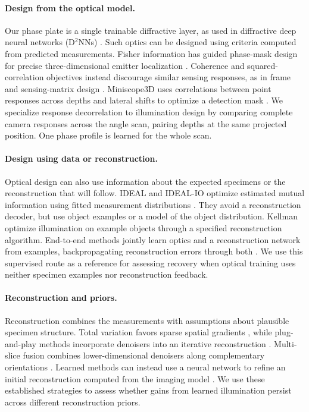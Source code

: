 \paragraph{Design from the optical model.}
Our phase plate is a single trainable diffractive layer, as used in diffractive deep neural networks (D$^2$NNs) \cite{lin2018}. Such optics can be designed using criteria computed from predicted measurements. Fisher information has guided phase-mask design for precise three-dimensional emitter localization \cite{shechtman2014}. Coherence and squared-correlation objectives instead discourage similar sensing responses, as in frame and sensing-matrix design \cite{elad2007,benedetto2003,duarte2009}. Miniscope3D uses correlations between point responses across depths and lateral shifts to optimize a detection mask \cite{yanny2020}. We specialize response decorrelation to illumination design by comparing complete camera responses across the angle scan, pairing depths at the same projected position. One phase profile is learned for the whole scan.

\paragraph{Design using data or reconstruction.}
Optical design can also use information about the expected specimens or the reconstruction that will follow. IDEAL and IDEAL-IO optimize estimated mutual information using fitted measurement distributions \cite{pinkard2025,markley2025}. They avoid a reconstruction decoder, but use object examples or a model of the object distribution. Kellman \etal~\cite{kellman2019} optimize illumination on example objects through a specified reconstruction algorithm. End-to-end methods jointly learn optics and a reconstruction network from examples, backpropagating reconstruction errors through both \cite{haputhanthri2022,nehme2020deepstorm3d,deb2022fouriernets}. We use this supervised route as a reference for assessing recovery when optical training uses neither specimen examples nor reconstruction feedback.

\paragraph{Reconstruction and priors.}
Reconstruction combines the measurements with assumptions about plausible specimen structure. Total variation favors sparse spatial gradients \cite{rudin1992}, while plug-and-play methods incorporate denoisers into an iterative reconstruction \cite{venkatakrishnan2013}. Multi-slice fusion combines lower-dimensional denoisers along complementary orientations \cite{majee2021}. Learned methods can instead use a neural network to refine an initial reconstruction computed from the imaging model \cite{jin2017}. We use these established strategies to assess whether gains from learned illumination persist across different reconstruction priors.
